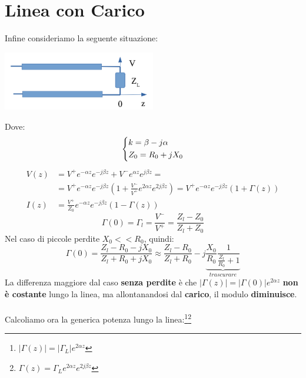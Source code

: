 \section{Linea con Carico}
Infine consideriamo la seguente situazione:
\begin{center}
    \includegraphics[width=0.5\textwidth]{Images/figure20.png}
\end{center}
Dove:
\begin{equation*}
    \begin{dcases}
    k = \beta - j \alpha\\
    Z_0 = R_0 + j X_0
    \end{dcases}
\end{equation*}
\begin{equation*}
\begin{aligned}
    V(z) &= V^+ e^{-\alpha z} e^{-j\beta z} + V^- e^{\alpha z} e^{j\beta z} = \\
    &= V^+ e^{-\alpha z} e^{-j\beta z} \left(1 + \frac{V^-}{V^+} e^{2\alpha z} e^{2j\beta z}\right) = V^+ e^{-\alpha z} e^{-j\beta z} \left(1 + \Gamma(z)\right)\\
    I(z) &= \frac{V^+}{Z_0} e^{-\alpha z} e^{-j\beta z} \left(1 - \Gamma(z)\right)
\end{aligned}
\end{equation*}
\begin{equation*}
    \Gamma(0) = \Gamma_l = \frac{V^-}{V^+} = \frac{Z_l - Z_0}{Z_l + Z_0}
\end{equation*}
Nel caso di piccole perdite $X_0 << R_0$, quindi:
\begin{equation*}
    \Gamma(0) = \frac{Z_l - R_0 - j X_0}{Z_l + R_0 + j X_0} \approx \frac{Z_l - R_0}{Z_l + R_0} - j \underbrace{\frac{X_0}{R_0} \frac{1}{\frac{Z_l}{R_0} + 1}}_{trascurare}
\end{equation*}
La differenza maggiore dal caso \textbf{senza perdite} è che $|\Gamma(z)| =|\Gamma(0)| e^{2\alpha z} $ \textbf{non è costante} lungo la linea, ma allontanandosi dal \textbf{carico}, il modulo \textbf{diminuisce}.\\ \\
Calcoliamo ora la generica potenza lungo la linea:\footnote{$|\Gamma(z)| = |\Gamma_L| e^{2\alpha z}$}\footnote{$\Gamma(z) = \Gamma_L e^{2\alpha z} e^{2j\beta z}$}
